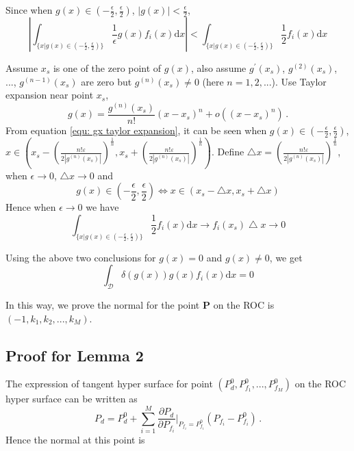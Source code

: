\documentclass[12pt,journal,a4paper,twoside,onecolumn,draft]{IEEEtran}
\begin{document}
\begin{spacing}{2.5}
Since when $g(x) \in (-\frac{\epsilon}{2}, \frac{\epsilon}{2})$, $|g(x)| < \frac{\epsilon}{2}$,
\begin{equation}|
\int_{\{x|g(x)\in (-\frac{\epsilon}{2}, \frac{\epsilon}{2})\}} \frac{1}{\epsilon} g(x)f_i(x) \mathrm{d}x | <
\int_{\{x|g(x)\in (-\frac{\epsilon}{2}, \frac{\epsilon}{2})\}} \frac{1}{2}f_i(x) \mathrm{d}x
\end{equation}

Assume $x_s$ is one of the zero point of $g(x)$, also assume $g^\prime(x_s)$, $g^{(2)}(x_s)$, ..., $g^{(n-1)}(x_s)$ are zero but $g^{(n)}(x_s) \neq 0$ (here $n = 1, 2, ...$). Use Taylor expansion near point $x_s$,
\begin{equation}
  \label{equ: gx taylor expansion}
  g(x) = \frac{g^{(n)}(x_s)}{n!}(x - x_s)^n + o((x - x_s)^n)\,.
\end{equation}
\def \LEFT{ x_s
  -\left(\frac{n!\varepsilon}{2|g^{(n)}(x_s)|}\right)^{\frac{1}{n}}}
  \def \RIGHT{ x_s
  +\left(\frac{n!\varepsilon}{2|g^{(n)}(x_s)|}\right)^{\frac{1}{n}}}
From equation \eqref{equ: gx taylor expansion}, it can be seen when $g(x)\in (-\frac{\epsilon}{2}, \frac{\epsilon}{2})$, $x \in \left(
      \LEFT, \RIGHT
  \right)$.  Define $\bigtriangleup x = \left(\frac{n!\varepsilon}{2|g^{(n)}(x_s)|}\right)^{\frac{1}{n}}$, when $\epsilon \rightarrow 0$, $\bigtriangleup x \rightarrow 0$ and
\begin{equation}
\label{pro: scale}
g(x) \in (-\frac{\epsilon}{2}, \frac{\epsilon}{2})  \Leftrightarrow x \in (x_s -\bigtriangleup x, x_s + \bigtriangleup x)
\end{equation}
 Hence when $\epsilon \rightarrow 0$ we have
\begin{equation}
\int_{\{x|g(x)\in (-\frac{\epsilon}{2}, \frac{\epsilon}{2})\}} \frac{1}{2}f_i(x) \mathrm{d}x \rightarrow
f_i(x_s)\bigtriangleup x \rightarrow 0
\end{equation}

Using the above two conclusions for $g(x) = 0$ and $g(x) \neq 0$, we get
\begin{equation}
\int_{\mathcal{D}} \delta (g(x)) g(x)f_i(x) \mathrm{d}x = 0
\end{equation}

In this way, we prove the normal for the point \textbf{P} on the ROC is $(-1, k_1, k_2, ..., k_M)$.

\subsection{Proof for Lemma 2}
The expression of tangent hyper surface for point $(P_d^0, P_{f_1}^0, ..., P_{f_M}^0)$ on the ROC hyper surface can be written as
\begin{equation}
P_d = P_d^0 + \sum_{i=1}^{M} \frac{\partial P_d}{\partial P_{f_i}}\bigg|_{P_{f_i} = P_{f_i}^0}(P_{f_i} - P_{f_i}^0)\,.
\end{equation}
Hence the normal at this point is


\end{spacing}
\end{document}
